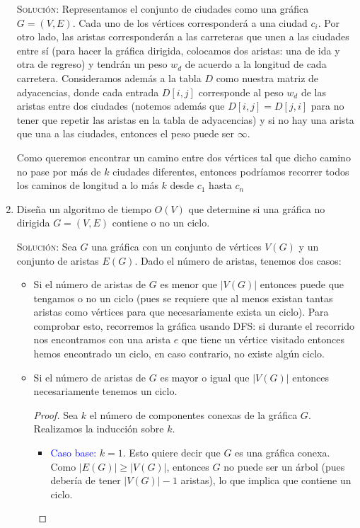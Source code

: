 \documentclass[letterpaper,11pt]{article}
\begin{document}
\begin{enumerate}
    \textsc{Solución:} Representamos el conjunto de ciudades como una gráfica
    $G = (V, E)$. Cada uno de los vértices corresponderá a una ciudad $c_i$. 
    Por otro lado, las aristas corresponderán a las carreteras que unen a las 
    ciudades entre sí (para hacer la gráfica dirigida, colocamos dos aristas: 
    una de ida y otra de regreso) y tendrán un peso $w_d$ de acuerdo a la 
    longitud de cada carretera. Consideramos además a la tabla $D$ como 
    nuestra matriz de adyacencias, donde cada entrada $D[i,j]$ corresponde al 
    peso $w_d$ de las aristas entre dos ciudades (notemos además que $D[i,j] = 
    D[j, i]$ para no tener que repetir las aristas en la tabla de adyacencias)
    y si no hay una arista que una a las ciudades, entonces el peso puede ser 
    $\infty$.

    Como queremos encontrar un camino entre dos vértices tal que dicho camino 
    no pase por más de $k$ ciudades diferentes, entonces podríamos recorrer 
    todos los caminos de longitud a lo más $k$ desde $c_1$ hasta $c_n$

    \item Diseña un algoritmo de tiempo $O(V)$ que determine si una gráfica no
    dirigida $G = (V, E)$ contiene o no un ciclo.

    \textsc{Solución:} Sea $G$ una gráfica con un conjunto de vértices $V(G)$ y 
    un conjunto de aristas $E(G)$. Dado el número de aristas, tenemos dos casos:
    \begin{itemize}
        \item Si el número de aristas de $G$ es menor que $|V(G)|$ entonces puede 
        que tengamos o no un ciclo (pues se requiere que al menos existan tantas
        aristas como vértices para que necesariamente exista un ciclo). Para 
        comprobar esto, recorremos la gráfica usando DFS: si durante el recorrido
        nos encontramos con una arista $e$ que tiene un vértice visitado entonces
        hemos encontrado un ciclo, en caso contrario, no existe algún ciclo. 

        \item Si el número de aristas de $G$ es mayor o igual que $|V(G)|$
        entonces necesariamente tenemos un ciclo.
        \begin{proof}
            Sea $k$ el número de componentes conexas de la gráfica $G$. 
            Realizamos la inducción sobre $k$.
            \begin{itemize}
                \item \textcolor{blue}{Caso base:} $k=1$. Esto quiere decir que 
                $G$ es una gráfica conexa. Como $|E(G)| \geq |V(G)|$, entonces 
                $G$ no puede ser un árbol (pues debería de tener $|V(G)|-1$ 
                aristas), lo que implica que contiene un ciclo.
                

\end{itemize}
\end{proof}
\end{itemize}
\end{enumerate}
\end{document}
